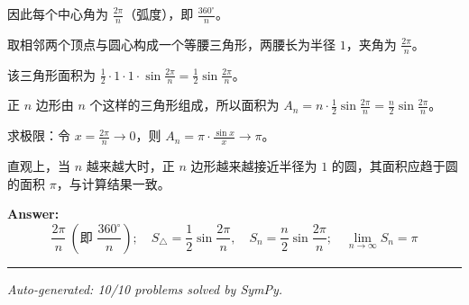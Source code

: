 \documentclass[12pt, a4paper]{article}
\begin{document}
因此每个中心角为 $\frac{2\pi}{n}$（弧度），即 $\frac{360^\circ}{n}$。

取相邻两个顶点与圆心构成一个等腰三角形，两腰长为半径 $1$，夹角为 $\frac{2\pi}{n}$。

该三角形面积为 $\frac12\cdot 1\cdot 1\cdot \sin\frac{2\pi}{n}=\frac12\sin\frac{2\pi}{n}$。

正 $n$ 边形由 $n$ 个这样的三角形组成，所以面积为 $A_n=n\cdot \frac12\sin\frac{2\pi}{n}=\frac n2\sin\frac{2\pi}{n}$。

求极限：令 $x=\frac{2\pi}{n}\to 0$，则 $A_n=\pi\cdot\frac{\sin x}{x}\to \pi$。

直观上，当 $n$ 越来越大时，正 $n$ 边形越来越接近半径为 $1$ 的圆，其面积应趋于圆的面积 $\pi$，与计算结果一致。

\textbf{Answer:}
\[\boxed{\frac{2\pi}{n}\ (\text{即 }\frac{360^\circ}{n});\quad S_{\triangle}=\frac12\sin\frac{2\pi}{n},\quad S_n=\frac n2\sin\frac{2\pi}{n};\quad \lim_{n\to\infty}S_n=\pi}\]

\vspace{1em}
\hrule
\vspace{1em}


\vspace{2em}
\noindent\textit{Auto-generated: 10/10 problems solved by SymPy.}
\end{document}
